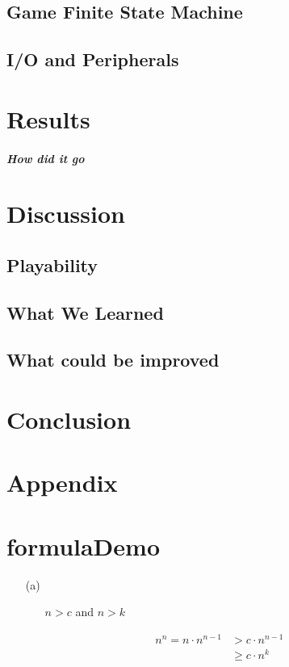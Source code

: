\documentclass[12pt, draft]{report}
\begin{document}
\subsection*{Game Finite State Machine}
\subsection*{I/O and Peripherals}

\pagebreak
\section*{Results}
\subparagraph*{How did it go}

\pagebreak
\section*{Discussion}
\subsection*{Playability}
\subsection*{What We Learned}
\subsection*{What could be improved}
\pagebreak
\section*{Conclusion}

\pagebreak
\section*{Appendix}


\pagebreak
\section*{formulaDemo}
\begin{enumerate}
    \item[(a)]
        \begin{itemize}
            \item[] $n > c$ and $n > k$
        \end{itemize}
        \begin{align*}
            n^n = n \cdot n^{n-1} &> c\cdot n^{n-1}\\
            &\geq c\cdot n^k
        \end{align*}
\end{enumerate}
\end{document}
